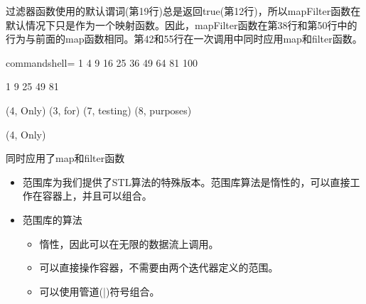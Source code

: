 过滤器函数使用的默认谓词(第19行)总是返回true(第12行)，所以mapFilter函数在默认情况下只是作为一个映射函数。因此，mapFilter函数在第38行和第50行中的行为与前面的map函数相同。第42和55行在一次调用中同时应用map和filter函数。

\begin{tcblisting}{commandshell={}}
1 4 9 16 25 36 49 64 81 100

1 9 25 49 81

(4, Only) (3, for) (7, testing) (8, purposes)

(4, Only)
\end{tcblisting}

\begin{center}
同时应用了map和filter函数
\end{center}

\begin{tcolorbox}[breakable,enhanced jigsaw,colback=mygreen!5!white,colframe=mygreen!75!black,title={总结}]
\begin{itemize}
\item 
范围库为我们提供了STL算法的特殊版本。范围库算法是惰性的，可以直接工作在容器上，并且可以组合。

\item 
范围库的算法
\begin{itemize}
\item 
惰性，因此可以在无限的数据流上调用。

\item 
可以直接操作容器，不需要由两个迭代器定义的范围。

\item 
可以使用管道(|)符号组合。
\end{itemize}
\end{itemize}
\end{tcolorbox}	
	
\newpage
	
	
	
	
	
	
	
	
	
	
	
	
	
	
	
	
	
	
	
	
	